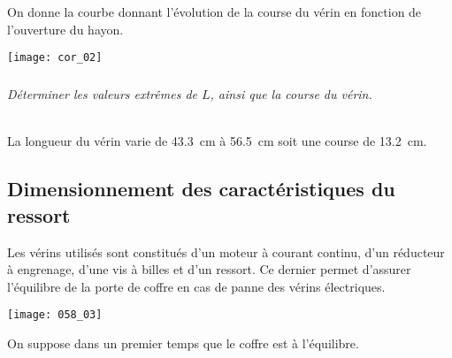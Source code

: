 \ifprof
\else
On donne la courbe donnant l'évolution de la course du vérin en fonction de l'ouverture du hayon. 
\begin{center}
\texttt{[image: cor\_02]}
\end{center}
\fi


\subparagraph{}
\textit{Déterminer les valeurs extrêmes de $L$, ainsi que la course du vérin.}
\ifprof
\begin{corrige}~\\
La longueur du vérin varie de \SI{43,3}{cm} à \SI{56,5}{cm} soit une course de \SI{13,2}{cm}. 
\end{corrige}
\else
\fi


%
%
%

\subsection*{Dimensionnement des caractéristiques du ressort}

\ifprof
\else
Les vérins utilisés sont constitués d’un moteur à courant continu, d’un réducteur à engrenage, d’une vis à billes et d’un ressort. Ce dernier permet d'assurer l'équilibre de la porte de coffre en cas de panne des vérins électriques. 

\begin{center}
\texttt{[image: 058\_03]}
\end{center}


On suppose dans un premier temps que le coffre est à l’équilibre.
\fi

